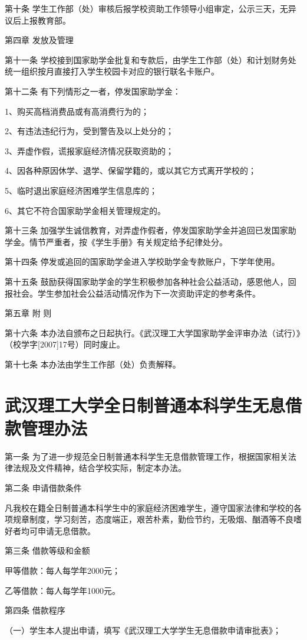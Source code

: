 \documentclass[UTF8,12pt,a4paper]{report}
\begin{document}
第十条 学生工作部（处）审核后报学校资助工作领导小组审定，公示三天，无异议后上报教育部。

第四章 发放及管理

第十一条 学校接到国家助学金批复和专款后，由学生工作部（处）和计划财务处统一组织按月直接打入学生校园卡对应的银行联名卡账户。

第十二条 有下列情形之一者，停发国家助学金：

1、购买高档消费品或有高消费行为的；

2、有违法违纪行为，受到警告及以上处分的；

3、弄虚作假，谎报家庭经济情况获取资助的；

4、因各种原因休学、退学、保留学籍的，或以其它方式离开学校的；

5、临时退出家庭经济困难学生信息库的；

6、其它不符合国家助学金相关管理规定的。

第十三条 加强学生诚信教育，对弄虚作假者，停发国家助学金并追回已发国家助学金。情节严重者，按《学生手册》有关规定给予纪律处分。

第十四条 停发或追回的国家助学金进入学校助学金专款账户，下学年使用。

第十五条 鼓励获得国家助学金的学生积极参加各种社会公益活动，感恩他人，回报社会。学生参加社会公益活动情况作为下一次资助评定的参考条件。

第五章 附 则

第十六条 本办法自颁布之日起执行。《武汉理工大学国家助学金评审办法（试行）》（校学字[2007]17号）同时废止。

第十七条 本办法由学生工作部（处）负责解释。

\chapter{武汉理工大学全日制普通本科学生无息借款管理办法}
第一条 为了进一步规范全日制普通本科学生无息借款管理工作，根据国家相关法律法规及文件精神，结合学校实际，制定本办法。

第二条 申请借款条件

凡我校在籍全日制普通本科学生中的家庭经济困难学生，遵守国家法律和学校的各项规章制度，学习刻苦，态度端正，艰苦朴素，勤俭节约，无吸烟、酗酒等不良嗜好者均可申请无息借款。

第三条 借款等级和金额

甲等借款：每人每学年2000元；

乙等借款：每人每学年1000元。

第四条 借款程序

（一）学生本人提出申请，填写《武汉理工大学学生无息借款申请审批表》；
\end{document}
